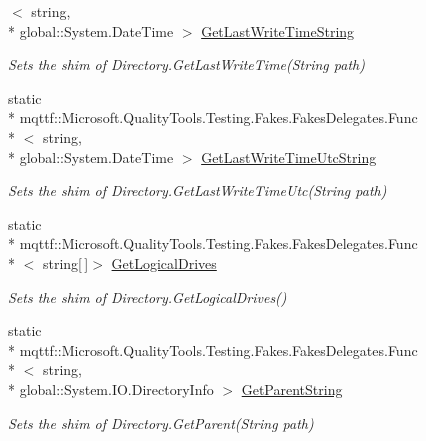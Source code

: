 \begin{DoxyCompactItemize}
$<$ string, \\*
global\-::\-System.\-Date\-Time $>$ \hyperlink{class_system_1_1_i_o_1_1_fakes_1_1_shim_directory_aa00c7abc99fb57c9204982e51176866c}{Get\-Last\-Write\-Time\-String}
\begin{DoxyCompactList}\small\item\em Sets the shim of Directory.\-Get\-Last\-Write\-Time(\-String path)\end{DoxyCompactList}\item 
static \\*
mqttf\-::\-Microsoft.\-Quality\-Tools.\-Testing.\-Fakes.\-Fakes\-Delegates.\-Func\\*
$<$ string, \\*
global\-::\-System.\-Date\-Time $>$ \hyperlink{class_system_1_1_i_o_1_1_fakes_1_1_shim_directory_aeb3fb87a2995e3d2629d7984f8282e66}{Get\-Last\-Write\-Time\-Utc\-String}
\begin{DoxyCompactList}\small\item\em Sets the shim of Directory.\-Get\-Last\-Write\-Time\-Utc(\-String path)\end{DoxyCompactList}\item 
static \\*
mqttf\-::\-Microsoft.\-Quality\-Tools.\-Testing.\-Fakes.\-Fakes\-Delegates.\-Func\\*
$<$ string\mbox{[}$\,$\mbox{]}$>$ \hyperlink{class_system_1_1_i_o_1_1_fakes_1_1_shim_directory_afacb8133ab242a0d276dc8cab6232ba5}{Get\-Logical\-Drives}
\begin{DoxyCompactList}\small\item\em Sets the shim of Directory.\-Get\-Logical\-Drives()\end{DoxyCompactList}\item 
static \\*
mqttf\-::\-Microsoft.\-Quality\-Tools.\-Testing.\-Fakes.\-Fakes\-Delegates.\-Func\\*
$<$ string, \\*
global\-::\-System.\-I\-O.\-Directory\-Info $>$ \hyperlink{class_system_1_1_i_o_1_1_fakes_1_1_shim_directory_aa3c267f14ca72761bba7ba5167976e78}{Get\-Parent\-String}
\begin{DoxyCompactList}\small\item\em Sets the shim of Directory.\-Get\-Parent(\-String path)\end{DoxyCompactList}\item 

\end{DoxyCompactItemize}
